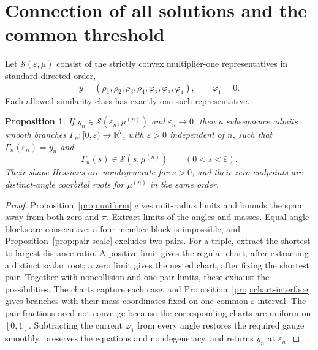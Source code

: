 \documentclass[11pt,a4paper]{article}
\numberwithin{equation}{section}
\newtheorem{proposition}[theorem]{Proposition}
\theoremstyle{remark}
\newcommand{\R}{\mathbb R}
\newcommand{\eps}{\varepsilon}
\begin{document}
\section{Connection of all solutions and the common threshold}
\label{sec:global}
Let $\mathcal S(\eps,\mu)$ consist of the strictly convex multiplier-one representatives in standard directed order,
\[
 y=(\rho_1,\rho_2,\rho_3,\rho_4,\varphi_2,\varphi_3,\varphi_4),
 \qquad \varphi_1=0.
\]
Each allowed similarity class has exactly one such representative.

\begin{proposition}\label{prop:connection}
If $y_n\in\mathcal S(\eps_n,\mu^{(n)})$ and $\eps_n\to0$, then a subsequence admits smooth branches $\Gamma_n:[0,\bar\eps)\to\R^7$, with $\bar\eps>0$ independent of $n$, such that $\Gamma_n(\eps_n)=y_n$ and
\[
 \Gamma_n(s)\in\mathcal S(s,\mu^{(n)})\qquad(0<s<\bar\eps).
\]
Their shape Hessians are nondegenerate for $s>0$, and their zero endpoints are distinct-angle coorbital roots for $\mu^{(n)}$ in the same order.
\end{proposition}
\begin{proof}
Proposition~\ref{prop:uniform} gives unit-radius limits and bounds the span away from both zero and $\pi$.
Extract limits of the angles and masses. Equal-angle blocks are consecutive; a four-member block is impossible, and Proposition~\ref{prop:pair-scale} excludes two pairs.
For a triple, extract the shortest-to-largest distance ratio. A positive limit gives the regular chart, after extracting a distinct scalar root; a zero limit gives the nested chart, after fixing the shortest pair.
Together with noncollision and one-pair limits, these exhaust the possibilities.
The charts capture each case, and Proposition~\ref{prop:chart-interface} gives branches with their mass coordinates fixed on one common $\eps$ interval. The pair fractions need not converge because the corresponding charts are uniform on $[0,1]$.
Subtracting the current $\varphi_1$ from every angle restores the required gauge smoothly, preserves the equations and nondegeneracy, and returns $y_n$ at $\eps_n$.
\end{proof}
\end{document}
